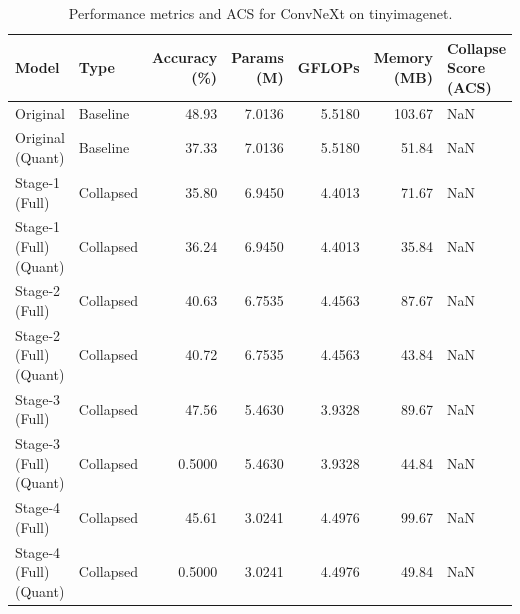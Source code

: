 \begin{table}
\caption{Performance metrics and ACS for ConvNeXt on tinyimagenet.}
\label{tab:ConvNeXt_tinyimagenet}
\begin{tabular}{llrrrrl}
\toprule
Model & Type & Accuracy (\%) & Params (M) & GFLOPs & Memory (MB) & Collapse Score (ACS) \\
\midrule
Original & Baseline & 48.93 & 7.0136 & 5.5180 & 103.67 & NaN \\
Original
(Quant) & Baseline & 37.33 & 7.0136 & 5.5180 & 51.84 & NaN \\
Stage-1 (Full) & Collapsed & 35.80 & 6.9450 & 4.4013 & 71.67 & NaN \\
Stage-1 (Full)
(Quant) & Collapsed & 36.24 & 6.9450 & 4.4013 & 35.84 & NaN \\
Stage-2 (Full) & Collapsed & 40.63 & 6.7535 & 4.4563 & 87.67 & NaN \\
Stage-2 (Full)
(Quant) & Collapsed & 40.72 & 6.7535 & 4.4563 & 43.84 & NaN \\
Stage-3 (Full) & Collapsed & 47.56 & 5.4630 & 3.9328 & 89.67 & NaN \\
Stage-3 (Full)
(Quant) & Collapsed & 0.5000 & 5.4630 & 3.9328 & 44.84 & NaN \\
Stage-4 (Full) & Collapsed & 45.61 & 3.0241 & 4.4976 & 99.67 & NaN \\
Stage-4 (Full)
(Quant) & Collapsed & 0.5000 & 3.0241 & 4.4976 & 49.84 & NaN \\
\bottomrule
\end{tabular}
\end{table}
